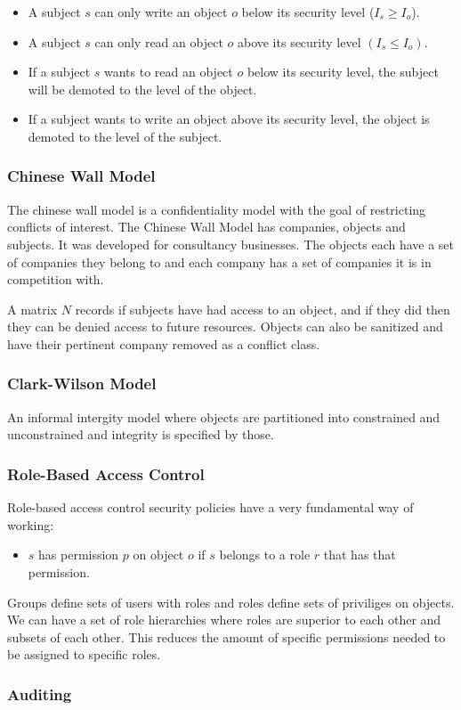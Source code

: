 \documentclass[11pt]{article}
\begin{document}
\begin{itemize}
    \item A subject $s$ can only write an object $o$ below its security level ($I_s \geq I_o$).
    \item A subject $s$ can only read an object $o$ above its security level $(I_s \leq I_o)$.
    \item If a subject $s$ wants to read an object $o$ below its security level, the subject will be demoted to the level of the object.
    \item If a subject wants to write an object above its security level, the object is demoted to the level of the subject.
\end{itemize}

\subsubsection{Chinese Wall Model}
The chinese wall model is a confidentiality model with the goal of restricting conflicts of interest.
The Chinese Wall Model has companies, objects and subjects.
It was developed for consultancy businesses.
The objects each have a set of companies they belong to and each company has a set of companies it is in competition with.

A matrix $N$ records if subjects have had access to an object, and if they did then they can be denied access to future resources.
Objects can also be sanitized and have their pertinent company removed as a conflict class.

\subsubsection{Clark-Wilson Model}
An informal intergity model where objects are partitioned into constrained and unconstrained and integrity is specified by those.

\subsubsection{Role-Based Access Control}
Role-based access control security policies have a very fundamental way of working:
\begin{itemize}
    \item $s$ has permission $p$ on object $o$ if $s$ belongs to a role $r$ that has that permission.
\end{itemize}
Groups define sets of users with roles and roles define sets of priviliges on objects.
We can have a set of role hierarchies where roles are superior to each other and subsets of each other.
This reduces the amount of specific permissions needed to be assigned to specific roles.

\subsubsection{Auditing}
\end{document}
